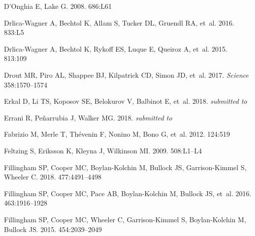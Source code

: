 \documentclass[a4paper]{ar-1col}
\begin{document}
\begin{thebibliography}{}
{D'Onghia} E, {Lake} G. 2008.
\textit{\apjl} 686:L61

{Drlica-Wagner} A, {Bechtol} K, {Allam} S, {Tucker} DL, {Gruendl} RA, et~al.
  2016.
\textit{\apjl} 833:L5

{Drlica-Wagner} A, {Bechtol} K, {Rykoff} ES, {Luque} E, {Queiroz} A, et~al.
  2015.
\textit{\apj} 813:109

{Drout} MR, {Piro} AL, {Shappee} BJ, {Kilpatrick} CD, {Simon} JD, et~al. 2017.
\textit{Science} 358:1570--1574

{Erkal} D, {Li} TS, {Koposov} SE, {Belokurov} V, {Balbinot} E, et~al. 2018.
\textit{submitted to \mnras}

{Errani} R, {Pe{\~n}arrubia} J, {Walker} MG. 2018.
\textit{submitted to \mnras}

{Fabrizio} M, {Merle} T, {Th{\'e}venin} F, {Nonino} M, {Bono} G, et~al. 2012.
\textit{\pasp} 124:519

{Feltzing} S, {Eriksson} K, {Kleyna} J, {Wilkinson} MI. 2009.
\textit{\aap} 508:L1--L4

{Fillingham} SP, {Cooper} MC, {Boylan-Kolchin} M, {Bullock} JS,
  {Garrison-Kimmel} S, {Wheeler} C. 2018.
\textit{\mnras} 477:4491--4498

{Fillingham} SP, {Cooper} MC, {Pace} AB, {Boylan-Kolchin} M, {Bullock} JS,
  et~al. 2016.
\textit{\mnras} 463:1916--1928

{Fillingham} SP, {Cooper} MC, {Wheeler} C, {Garrison-Kimmel} S,
  {Boylan-Kolchin} M, {Bullock} JS. 2015.
\textit{\mnras} 454:2039--2049


\end{thebibliography}
\end{document}
